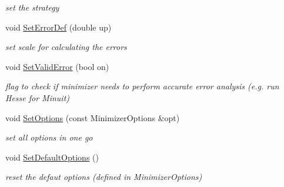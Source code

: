 \begin{DoxyCompactItemize}
\begin{DoxyCompactList}\small\item\em set the strategy \end{DoxyCompactList}\item 
void \mbox{\hyperlink{classROOT_1_1Math_1_1Minimizer_a24e7d646b58b9d5d2778c7c0399677da}{Set\+Error\+Def}} (double up)
\begin{DoxyCompactList}\small\item\em set scale for calculating the errors \end{DoxyCompactList}\item 
void \mbox{\hyperlink{classROOT_1_1Math_1_1Minimizer_a31289e6911a86aba956d0050cee2555b}{Set\+Valid\+Error}} (bool on)
\begin{DoxyCompactList}\small\item\em flag to check if minimizer needs to perform accurate error analysis (e.\+g. run Hesse for Minuit) \end{DoxyCompactList}\item 
void \mbox{\hyperlink{classROOT_1_1Math_1_1Minimizer_ac1546eeefbfb78bcfaf6d06cfde227c5}{Set\+Options}} (const Minimizer\+Options \&opt)
\begin{DoxyCompactList}\small\item\em set all options in one go \end{DoxyCompactList}\item 
void \mbox{\hyperlink{classROOT_1_1Math_1_1Minimizer_a4811690d47537dbc0ab09d50d57ce34f}{Set\+Default\+Options}} ()
\begin{DoxyCompactList}\small\item\em reset the defaut options (defined in Minimizer\+Options) \end{DoxyCompactList}\end{DoxyCompactItemize}
